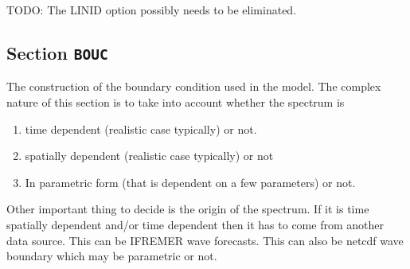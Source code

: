 \documentclass[12pt]{amsart}
\begin{document}
TODO: The LINID option possibly needs to be eliminated.





\subsection{Section {\tt BOUC}}
The construction of the boundary condition used in the model. The complex nature of this section is to take into account whether the spectrum is
\begin{enumerate}
\item time dependent (realistic case typically) or not.
\item spatially dependent (realistic case typically) or not
\item In parametric form (that is dependent on a few parameters) or not.
\end{enumerate}
Other important thing to decide is the origin of the spectrum. If it is time spatially dependent and/or time dependent then it has to come from another data source. This can be IFREMER wave forecasts. This can also be netcdf wave boundary which may be parametric or not.
\end{document}
